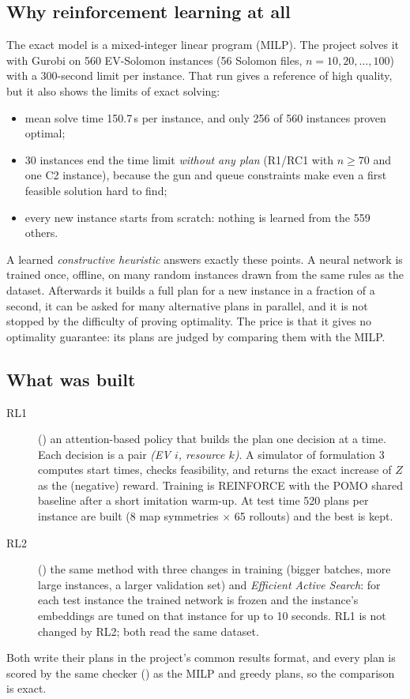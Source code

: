 \subsection{Why reinforcement learning at all}

The exact model is a mixed-integer linear program (MILP). The project solves it with Gurobi on 560 EV-Solomon instances (56 Solomon files, $n=10,20,\dots,100$) with a 300-second limit per instance. That run gives a reference of high quality, but it also shows the limits of exact solving:
\begin{itemize}
  \item mean solve time 150.7\,s per instance, and only 256 of 560 instances proven optimal;
  \item 30 instances end the time limit \emph{without any plan} (R1/RC1 with $n\ge70$ and one C2 instance), because the gun and queue constraints make even a first feasible solution hard to find;
  \item every new instance starts from scratch: nothing is learned from the 559 others.
\end{itemize}
A learned \emph{constructive heuristic} answers exactly these points. A neural network is trained once, offline, on many random instances drawn from the same rules as the dataset. Afterwards it builds a full plan for a new instance in a fraction of a second, it can be asked for many alternative plans in parallel, and it is not stopped by the difficulty of proving optimality. The price is that it gives no optimality guarantee: its plans are judged by comparing them with the MILP.

\subsection{What was built}

\begin{description}
  \item[RL1] () an attention-based policy that builds the plan one decision at a time. Each decision is a pair \emph{(EV $i$, resource $k$)}. A simulator of formulation 3 computes start times, checks feasibility, and returns the exact increase of $Z$ as the (negative) reward. Training is REINFORCE with the POMO shared baseline after a short imitation warm-up. At test time 520 plans per instance are built (8 map symmetries $\times$ 65 rollouts) and the best is kept.
  \item[RL2] () the same method with three changes in training (bigger batches, more large instances, a larger validation set) and \emph{Efficient Active Search}: for each test instance the trained network is frozen and the instance's embeddings are tuned on that instance for up to 10 seconds. RL1 is not changed by RL2; both read the same dataset.
\end{description}
Both write their plans in the project's common results format, and every plan is scored by the same checker () as the MILP and greedy plans, so the comparison is exact.

